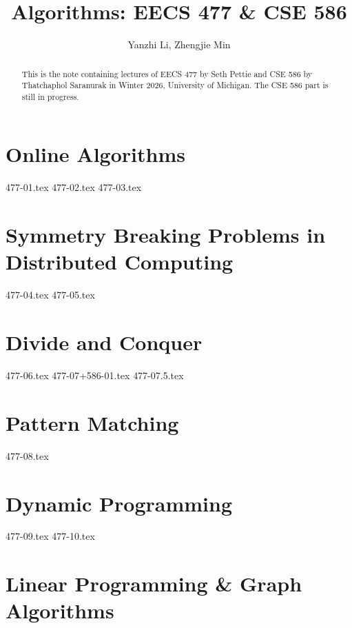 \documentclass[a4paper]{report}
\author{Yanzhi Li, Zhengjie Min}
\title{Algorithms: EECS 477 \& CSE 586}
\begin{document}
\maketitle

\begin{abstract}
	This is the note containing lectures of EECS 477 by Seth Pettie and CSE 586 by Thatchaphol Saranurak in Winter 2026, University of Michigan. The CSE 586 part is still in progress.
\end{abstract}

\newpage

\tableofcontents

\part{Online Algorithms}

{477-01.tex}
{477-02.tex}
{477-03.tex}

\part{Symmetry Breaking Problems in Distributed Computing}

{477-04.tex}
{477-05.tex}

\part{Divide and Conquer}

{477-06.tex}
{477-07+586-01.tex}
{477-07.5.tex}

\part{Pattern Matching}

{477-08.tex}

\part{Dynamic Programming}

{477-09.tex}
{477-10.tex}

\part{Linear Programming \& Graph Algorithms}
\end{document}

